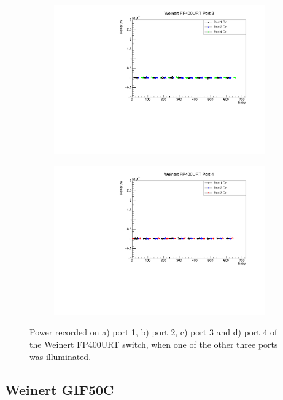 \documentclass[a4paper,11pt]{article}
\begin{document}
\begin{figure}[h!]
\begin{subfigure}{0.5\textwidth}
\includegraphics[width=\linewidth]{WeinertFP400URTPort3.pdf}
\subcaption{}\label{fig:weinfp400crosstalkport3}
\end{subfigure}%
\begin{subfigure}{0.5\textwidth}
\includegraphics[width=\linewidth]{WeinertFP400URTPort4.pdf}
\subcaption{}\label{fig:weinfp400crosstalkport4}
\end{subfigure}
\caption{Power recorded on a) port 1, b) port 2, c) port 3 and d) port 4 of the Weinert FP400URT switch, when one of the other three ports was illuminated.}\label{fig:weinfp400crosstalk2}
\end{figure}

\clearpage
\newpage
\subsection{Weinert GIF50C}
\end{document}
